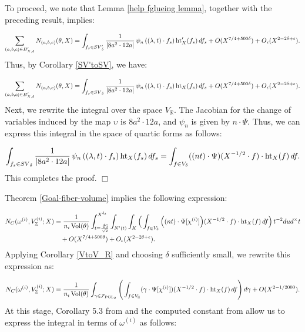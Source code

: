 \documentclass{article}
\def\Z{{\mathbb Z}}
\def\PGL{{\rm PGL}}
\def\Vol{{\rm Vol}}
\def\R{{\mathbb R}}
\def\Z{{\mathbb Z}}
\def \h{{\rm ht}}
\newenvironment{customproof}[1][]
{\par\noindent{\textbf{Proof of #1:}}\quad}
{$\Box$ \vspace{2 ex}}
\def \SV{{SV}_{\delta}}
\def \dw{{t^{-2}dud^\times t  }}
\begin{document}
\begin{customproof}[Proposition \ref{Gluing-fiber-volumes}] To proceed, we note that Lemma \ref{help fglueing lemma}, together with the preceding result, implies:

\begin{equation*} 
\sum_{(a,b,c) \in B_{X,\delta}'} N_{(a,b,c)}(\theta, X) = \int_{f_s \in \SV'} \frac{1}{|8a^2 \cdot 12a|} \, \psi_{n}\left((\lambda, t) \cdot f_s\right) \h_X'(f_s) \, df_s + O(X^{7/4 + 500\delta}) + O_{\epsilon}(X^{2-2\delta+\epsilon}).
\end{equation*} 
Thus, by Corollary \ref{SV'toSV}, we have:

\begin{equation*} 
\sum_{(a,b,c) \in B_{X,\delta}'} N_{(a,b,c)}(\theta, X) = \int_{f_s \in \SV} \frac{1}{|8a^2 \cdot 12a|} \, \psi_{n}\left((\lambda, t) \cdot f_s\right) \h_X(f_s) \, df_s + O(X^{7/4 + 500\delta}) + O_{\epsilon}(X^{2-2\delta+\epsilon}).
\end{equation*} 
Next, we rewrite the integral over the space $V_{\mathbb{R}}$. The Jacobian for the change of variables induced by the map $\upsilon$ is $8a^2 \cdot 12a$, and $\psi_{n}$ is given by $n \cdot \Psi$. Thus, we can express this integral in the space of quartic forms as follows:

\begin{equation*}
    \int_{f_s \in \SV} \frac{1}{|8a^2 \cdot 12a|} \, \psi_{n}\left((\lambda, t) \cdot f_s\right) \h_X(f_s) \, df_s = \int_{f \in V_{\delta}} ((nt) \cdot \Psi)(X^{-1/2} \cdot f) \cdot \h_X(f) \, df.
\end{equation*}
This completes the proof.
\end{customproof}

Theorem \ref{Goal-fiber-volume} implies the following expression:

\begin{align*}
 N_C(\omega^{(i)}, V_{\Z}^{(i)}; X) &= \frac{1}{n_i \, \Vol(\theta)} \int_{t = \frac{\sqrt[4]{3}}{\sqrt{2}}}^{X^{\delta_t}} \int_{N'(t)} \int_{K} 
 \Big( \int_{f \in V_{\delta}} \Big((nt) \cdot \Psi[\chi^{(i)}]\Big)(X^{-1/2} \cdot f) \cdot \h_{X}(f) \,df \Big) \, \dw \\ 
 &\quad + O(X^{7/4 + 500\delta}) + O_{\epsilon}(X^{2 - 2\delta + \epsilon}).
\end{align*}
Applying Corollary \ref{VtoV_R} and choosing $\delta$ sufficiently small, we rewrite this expression as:

\begin{equation*}
 N_C(\omega^{(i)}, V_{\Z}^{(i)}; X) = \frac{1}{n_i \, \Vol(\theta)} \int_{\gamma \in \mathcal{F}_{\PGL_2}} \Bigg( \int_{f \in V_{\R}} (\gamma \cdot \Psi[\chi^{(i)}])(X^{-1/2} \cdot f) \cdot \h_{X}(f) \, df \Bigg) \, d\gamma + O(X^{2 - 1/2000}).
\end{equation*}
At this stage, Corollary 5.3 from \cite{moment} and the computed constant from \cite{main} allow us to express the integral in terms of $\omega^{(i)}$ as follows:
\end{document}
